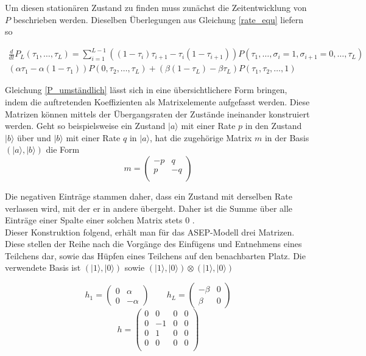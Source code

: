 \documentclass[10pt,a4paper]{report}
\begin{document}
Um diesen stationären Zustand zu finden muss zunächst die Zeitentwicklung von $P$ beschrieben werden. Dieselben Überlegungen aus Gleichung \ref{rate_equ} liefern so

\begin{equation}\label{P_umständlich}
\begin{split}
\frac{d}{dt}P_L(\tau_1,\ldots,\tau_L) = \sum_{i=1}^{L-1}((1-\tau_i)\tau_{i+1}-\tau_i(1-\tau_{i+1}) )P(\tau_1,\ldots,\sigma_i=1,\sigma_{i+1}=0,\ldots,\tau_L)\\
(\alpha\tau_1-\alpha(1-\tau_1)) P(0,\tau_2,\ldots,\tau_L)+(\beta(1-\tau_L)-\beta\tau_L) P(\tau_1,\tau_2,\ldots,1)
\end{split}
\end{equation}

Gleichung \ref{P_umständlich} lässt sich in eine übersichtlichere Form bringen, indem die auftretenden Koeffizienten als Matrixelemente aufgefasst werden. Diese Matrizen können mittels der Übergangsraten der Zustände ineinander konstruiert werden. Geht so beispielsweise ein Zustand $|a\rangle$ mit einer Rate $p$ in den Zustand $|b\rangle$ über und $|b\rangle$ mit einer Rate $q$ in $|a\rangle$, hat die zugehörige Matrix $m$ in der Basis $(|a\rangle,|b\rangle)$ die Form
\begin{equation}
m=
\begin{pmatrix}
-p&q\\
p&-q\\
\end{pmatrix}
\end{equation}

Die negativen Einträge stammen daher, dass ein Zustand mit derselben Rate verlassen wird, mit der er in andere übergeht. Daher ist die Summe über alle Einträge einer Spalte einer solchen Matrix stets 0 \cite{ASEP_Update}.\\

Dieser Konstruktion folgend, erhält man für das ASEP-Modell drei Matrizen. Diese stellen der Reihe nach die Vorgänge des Einfügens und Entnehmens eines Teilchens dar, sowie das Hüpfen eines Teilchens auf den benachbarten Platz. Die verwendete Basis ist $(|1\rangle,|0\rangle)$ sowie $(|1\rangle,|0\rangle)\otimes(|1\rangle,|0\rangle)$

\begin{equation}
h_1=
\begin{pmatrix}
0&\alpha\\ 0&-\alpha
\end{pmatrix}
\qquad
h_L=
\begin{pmatrix}
-\beta&0\\ \beta&0
\end{pmatrix}
\end{equation}
\vspace{1px}
\begin{equation*}
h=
\begin{pmatrix}
0&0&0&0\\
0&-1&0&0\\
0&1&0&0\\
0&0&0&0\\
\end{pmatrix}
\end{equation*}
\end{document}
